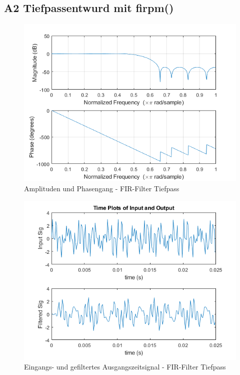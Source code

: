 \newpage
\subsection{A2 Tiefpassentwurd mit firpm()}






\begin{figure}[h]
\centering
\includegraphics[width=0.7\linewidth]{./Bilder/Attachment_A2_fir_2b_Amplitudengang}
\caption{Amplituden und Phasengang - FIR-Filter Tiefpass}
\label{fig:Attachment_A2_fir_2b_Amplitudengang}
\end{figure}

\begin{figure}[h]
\centering
\includegraphics[width=0.7\linewidth]{./Bilder/Attachment_A2_fir_2b_Timeplot}
\caption{Eingangs- und gefiltertes Ausgangszeitsignal  - FIR-Filter Tiefpass}
\label{fig:Attachment_A2_fir_2b_Timeplot}
\end{figure}

